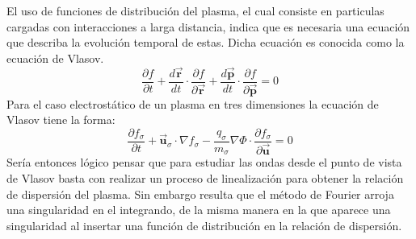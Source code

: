 \documentclass[../tesis_main_file.tex]{subfiles}
\begin{document}
El uso de funciones de distribución del plasma, el cual consiste en particulas cargadas con interacciones a larga distancia, indica que es necesaria una ecuación que describa la evolución temporal de estas. Dicha ecuación es conocida como la ecuación de Vlasov.\cite{bellan2008fundamentals}\\
\begin{equation}
\label{eq:vlasov_def}
\frac{\partial f}{\partial t} + \frac{d\overrightarrow{\textbf{r}}}{dt}\cdot \frac{\partial f}{\partial \overrightarrow{\textbf{r}}} + \frac{d \overrightarrow{\textbf{p}}}{dt}\cdot \frac{\partial f}{\partial \overrightarrow{\textbf{p}}}=0
\end{equation}
Para el caso electrostático de un plasma en tres dimensiones la ecuación de Vlasov tiene la forma:
\begin{equation}
\label{eq:vlasov-poisson_3D}
\frac{\partial f_{\sigma}}{\partial t} + \overrightarrow{\textbf{u}}_{\sigma} \cdot \nabla f_{\sigma} -\frac{q_{\sigma}}{m_{\sigma}}\nabla \Phi \cdot \frac{\partial f_{\sigma}}{\partial \overrightarrow{\textbf{u}}}=0
\end{equation}
Sería entonces lógico pensar que para estudiar las ondas desde el punto de vista de Vlasov basta con realizar un proceso de linealización para obtener la relación de dispersión del plasma. Sin embargo resulta que el método de Fourier arroja una singularidad en el integrando, de la misma manera en la que aparece una singularidad al insertar una función de distribución en la relación de dispersión.\\
\end{document}
